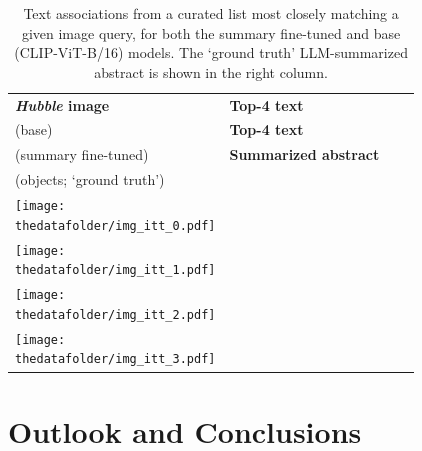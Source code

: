 \documentclass[10pt]{article} %
\newcommand{\hubble}{\emph{Hubble}\xspace}
\begin{document}
\begin{table}[h!]
  \centering
  \renewcommand{\arraystretch}{0.1}
  \begin{tabular}{m{3cm} m{3.2cm} m{3.2cm} m{5cm}}
      \toprule
      \centering \bfseries \hubble image & \centering \textbf{Top-4 text} \\ {\textcolor{deeppurple}{(base)}} & \centering  \textbf{Top-4 text} \\ {\textcolor{deepred}{(summary fine-tuned)}} & \centering \textbf{Summarized abstract} \\ (objects; `ground truth') \tabularnewline
      \midrule
      \centering \texttt{[image: \\thedatafolder/img\_itt\_0.pdf]} & \centering \scriptsize  & \centering  \scriptsize  &  {\scriptsize } \tabularnewline
      \midrule
      \centering \texttt{[image: \\thedatafolder/img\_itt\_1.pdf]} & \centering \scriptsize  & \centering  \scriptsize  &  {\scriptsize } \tabularnewline
      \midrule
      \centering \texttt{[image: \\thedatafolder/img\_itt\_2.pdf]} & \centering \scriptsize  & \centering  \scriptsize  &  {\scriptsize } \tabularnewline
      \midrule
      \centering \texttt{[image: \\thedatafolder/img\_itt\_3.pdf]} & \centering \scriptsize  & \centering  \scriptsize  &  {\scriptsize } \tabularnewline
      \bottomrule
  \end{tabular}
  \caption{Text associations from a curated list most closely matching a given image query, for both the \textcolor{deepred}{summary fine-tuned} and \textcolor{deeppurple}{base} (CLIP-ViT-B/16) models. The `ground truth' LLM-summarized abstract is shown in the right column.}
  \label{tab:itt}
\end{table}

\section{Outlook and Conclusions}
\label{sec:conclusion}
\end{document}

